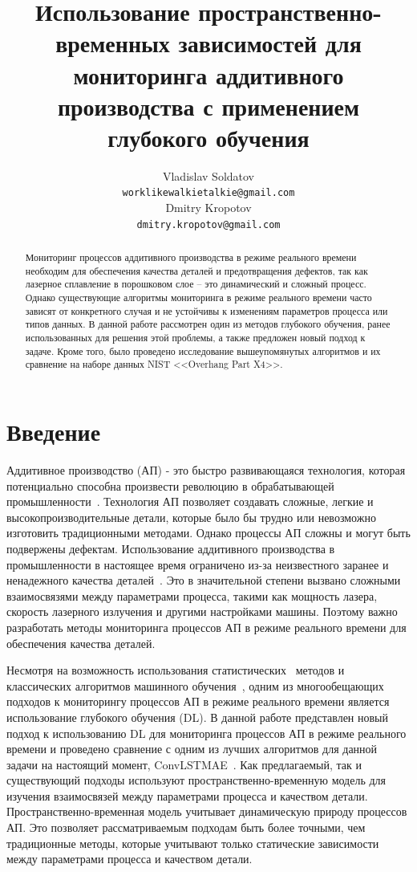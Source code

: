 \documentclass{article}
\title{Использование пространственно-временных зависимостей для мониторинга аддитивного производства с применением глубокого обучения}
\author{Vladislav Soldatov\\
	\texttt{worklikewalkietalkie@gmail.com} \\
	\And
	  Dmitry Kropotov \\
	\texttt{dmitry.kropotov@gmail.com} \\
}
\date{}
\begin{document}
\maketitle

\begin{abstract}
	Мониторинг процессов аддитивного производства в режиме реального времени необходим для обеспечения качества деталей и предотвращения дефектов, так как лазерное сплавление в порошковом слое -- это динамический и сложный процесс. Однако существующие алгоритмы мониторинга в режиме реального времени часто зависят от конкретного случая и не устойчивы к изменениям параметров процесса или типов данных. В данной работе рассмотрен один из методов глубокого обучения, ранее использованных для решения этой проблемы, а также предложен новый подход к задаче. Кроме того, было проведено исследование вышеупомянутых алгоритмов и их сравнение на наборе данных NIST <<Overhang Part X4>>. 
\end{abstract}



\section{Введение}
    Аддитивное производство (АП) - это быстро развивающаяся технология, которая потенциально способна произвести революцию в обрабатывающей промышленности~\cite{AMisCool}. Технология АП позволяет создавать сложные, легкие и высокопроизводительные детали, которые было бы трудно или невозможно изготовить традиционными методами. Однако процессы АП сложны и могут быть подвержены дефектам. Использование аддитивного производства в промышленности в настоящее время ограничено из-за неизвестного заранее и ненадежного качества деталей~\cite{Grasso2017ProcessDA}. Это в значительной степени вызвано сложными взаимосвязями между параметрами процесса, такими как мощность лазера, скорость лазерного излучения и другими настройками машины. Поэтому важно разработать методы мониторинга процессов АП в режиме реального времени для обеспечения качества деталей.

    Несмотря на возможность использования статистических~\cite{gaussian_process} методов и классических алгоритмов машинного обучения~\cite{classic_ml}, одним из многообещающих подходов к мониторингу процессов АП в режиме реального времени является использование глубокого обучения (DL). В данной работе представлен новый подход к использованию DL для мониторинга процессов АП в режиме реального времени и проведено сравнение с одним из лучших алгоритмов для данной задачи на настоящий момент, ConvLSTMAE~\cite{convlstm_nist}. Как предлагаемый, так и существующий подходы используют пространственно-временную модель для изучения взаимосвязей между параметрами процесса и качеством детали. Пространственно-временная модель учитывает динамическую природу процессов АП. Это позволяет рассматриваемым подходам быть более точными, чем традиционные методы, которые учитывают только статические зависимости между параметрами процесса и качеством детали.
\end{document}
